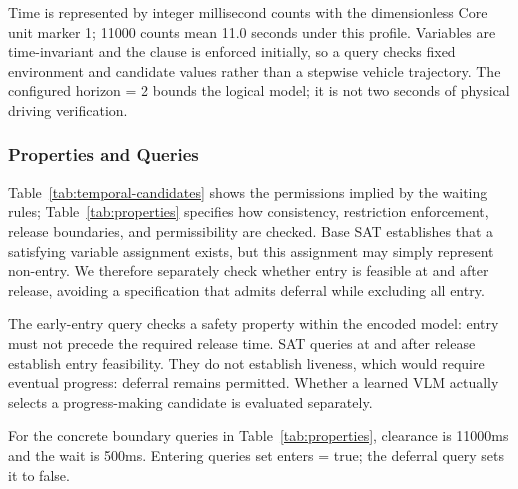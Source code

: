 \documentclass[nolineno]{ieeeaccess}
\begin{document}
Time is represented by integer millisecond counts with the dimensionless Core unit marker {\ttfamily{}\selectfont\footnotesize 1}; 11000 counts mean 11.0 seconds under this profile. Variables are time-invariant and the clause is enforced initially, so a query checks fixed environment and candidate values rather than a stepwise vehicle trajectory. The configured {\ttfamily{}\selectfont\footnotesize horizon = 2} bounds the logical model; it is not two seconds of physical driving verification.\par

\subsubsection{Properties and Queries}

Table~\ref{tab:temporal-candidates} shows the permissions implied by the waiting rules; Table~\ref{tab:properties} specifies how consistency, restriction enforcement, release boundaries, and permissibility are checked. Base SAT establishes that a satisfying variable assignment exists, but this assignment may simply represent non-entry. We therefore separately check whether entry is feasible at and after release, avoiding a specification that admits deferral while excluding all entry.\par

The early-entry query checks a safety property within the encoded model: entry must not precede the required release time. SAT queries at and after release establish entry feasibility. They do not establish liveness, which would require eventual progress: deferral remains permitted. Whether a learned VLM actually selects a progress-making candidate is evaluated separately.\par

For the concrete boundary queries in Table~\ref{tab:properties}, clearance is 11000ms and the wait is 500ms. Entering queries set {\ttfamily{}\selectfont\footnotesize enters = true}; the deferral query sets it to false.\par
\end{document}
